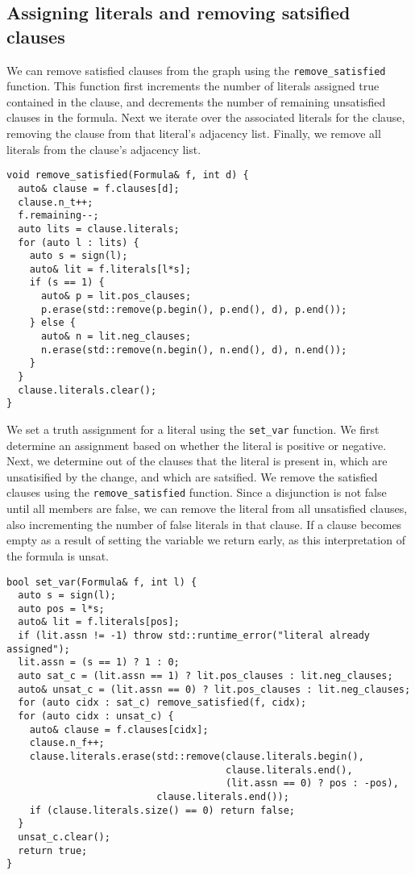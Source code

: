 \documentclass[10pt,AMS Euler]{article}
\begin{document}
\subsection*{Assigning literals and removing satsified clauses}
\label{sec:org30726a6}
We can remove satisfied clauses from the graph using the \texttt{remove\_satisfied}
function. This function first increments the number of literals assigned true
contained in the clause, and decrements the number of remaining unsatisfied
clauses in the formula. Next we iterate over the associated literals for the clause,
removing the clause from that literal's adjacency list. Finally, we remove all literals
from the clause's adjacency list.
\begin{verbatim}
void remove_satisfied(Formula& f, int d) {
  auto& clause = f.clauses[d];
  clause.n_t++;
  f.remaining--;
  auto lits = clause.literals;
  for (auto l : lits) {
    auto s = sign(l);
    auto& lit = f.literals[l*s];
    if (s == 1) {
      auto& p = lit.pos_clauses;
      p.erase(std::remove(p.begin(), p.end(), d), p.end());
    } else {
      auto& n = lit.neg_clauses;
      n.erase(std::remove(n.begin(), n.end(), d), n.end());
    }
  }
  clause.literals.clear();
}
\end{verbatim}
We set a truth assignment for a literal using the \texttt{set\_var} function.
We first determine an assignment based on whether the literal is positive or negative.
Next, we determine out of the clauses that the literal is present in, which are unsatisified
by the change, and which are satsified. We remove the satisfied clauses using the
\texttt{remove\_satisfied} function. Since a disjunction is not false until all members are false,
we can remove the literal from all unsatisfied clauses, also incrementing the number
of false literals in that clause. If a clause becomes empty as a result of setting the
variable we return early, as this interpretation of the formula is unsat.
\begin{verbatim}
bool set_var(Formula& f, int l) {
  auto s = sign(l);
  auto pos = l*s;
  auto& lit = f.literals[pos];
  if (lit.assn != -1) throw std::runtime_error("literal already assigned");
  lit.assn = (s == 1) ? 1 : 0;
  auto sat_c = (lit.assn == 1) ? lit.pos_clauses : lit.neg_clauses;
  auto& unsat_c = (lit.assn == 0) ? lit.pos_clauses : lit.neg_clauses;
  for (auto cidx : sat_c) remove_satisfied(f, cidx);
  for (auto cidx : unsat_c) {
    auto& clause = f.clauses[cidx];
    clause.n_f++;
    clause.literals.erase(std::remove(clause.literals.begin(),
                                      clause.literals.end(),
                                      (lit.assn == 0) ? pos : -pos),
                          clause.literals.end());
    if (clause.literals.size() == 0) return false;
  }
  unsat_c.clear();
  return true;
}
\end{verbatim}
\end{document}
